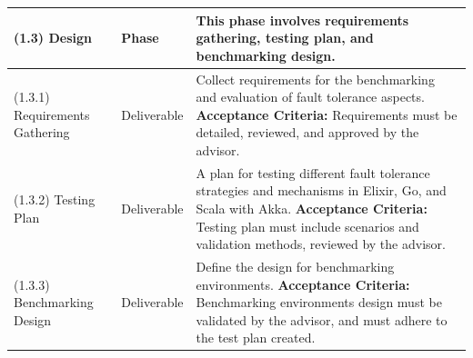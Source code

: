 \begin{longtable}{|p{3cm}|p{2.5cm}|p{8cm}|}
      (1.3) Design                   & Phase                 & This phase involves requirements gathering, testing plan, and benchmarking design.                                                                                                                                                                                                                                                                        \\ \hline
      (1.3.1) Requirements Gathering & Deliverable           & Collect requirements for the benchmarking and evaluation of fault tolerance aspects. \newline \textbf{Acceptance Criteria:} Requirements must be detailed, reviewed, and approved by the advisor.                                                                                                                                                         \\ \hline
      (1.3.2) Testing Plan           & Deliverable           & A plan for testing different fault tolerance strategies and mechanisms in Elixir, Go, and Scala with Akka. \newline \textbf{Acceptance Criteria:} Testing plan must include scenarios and validation methods, reviewed by the advisor.                                                                                                                    \\ \hline
      (1.3.3) Benchmarking Design    & Deliverable           & Define the design for benchmarking environments. \newline \textbf{Acceptance Criteria:} Benchmarking environments design must be validated by the advisor, and must adhere to the test plan created.                                                                                                                                                      \\ \hline
      \hline %


\end{longtable}
